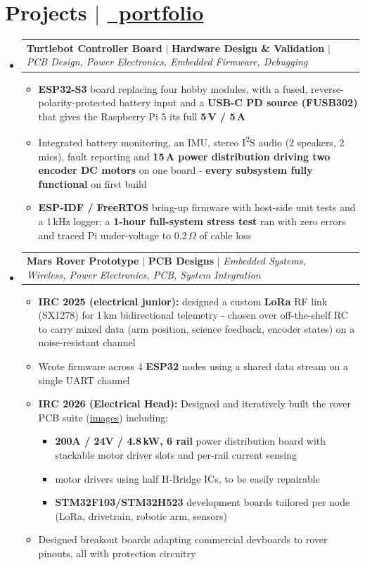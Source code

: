 \documentclass[a4paper,11pt]{article}
\makeatletter
\newcommand{\resumeItem}[1]{
  \item\small{{#1 \vspace{-2pt}}}
}
\newcommand{\resumeProjectHeading}[2]{
    \item
    \begin{tabular*}{1.001\textwidth}{l@{\extracolsep{\fill}}r}
      \small#1 & \textbf{\small #2}\\
    \end{tabular*}\vspace{-5pt}
}
\newcommand{\resumeSubHeadingListStart}{\begin{itemize}[leftmargin=0.0in, label={}]}
\newcommand{\resumeSubHeadingListEnd}{\end{itemize}}
\newcommand{\resumeItemListStart}{\begin{itemize}}
\newcommand{\resumeItemListEnd}{\end{itemize}\vspace{-5pt}}
\makeatother
\begin{document}
\section{Projects $|$ \href{https://github.com/anbu-05/Portfolio}{\normalfont\footnotesize
\faGithub\ portfolio}}
\vspace{-5pt}
\resumeSubHeadingListStart
\resumeProjectHeading
    {\textbf{Turtlebot Controller Board} $|$ \textbf{Hardware Design \& Validation} $|$ \emph{PCB Design, Power Electronics, Embedded Firmware, Debugging}}{}
    \resumeItemListStart
        \resumeItem{\textbf{ESP32-S3} board replacing four hobby modules, with a fused, reverse-polarity-protected battery input and a \textbf{USB-C PD source (FUSB302)} that gives the Raspberry Pi 5 its full \textbf{5\,V / 5\,A}}
        \resumeItem{Integrated battery monitoring, an IMU, stereo I\textsuperscript{2}S audio (2 speakers, 2 mics), fault reporting and \textbf{15\,A power distribution driving two encoder DC motors} on one board - \textbf{every subsystem fully functional} on first build}
        \resumeItem{\textbf{ESP-IDF / FreeRTOS} bring-up firmware with host-side unit tests and a 1\,kHz logger; a \textbf{1-hour full-system stress test} ran with zero errors and traced Pi under-voltage to 0.2\,$\Omega$ of cable loss}
    \resumeItemListEnd
\vspace{-13pt}
\resumeProjectHeading
    {\textbf{Mars Rover Prototype} $|$ \textbf{PCB Designs} $|$ \emph{Embedded Systems, Wireless, Power Electronics, PCB, System Integration}}{}
    \resumeItemListStart
        \resumeItem{\textbf{IRC 2025 (electrical junior):} designed a custom \textbf{LoRa} RF link (SX1278) for 1\,km bidirectional telemetry - chosen over off-the-shelf RC to carry mixed data (arm position, science feedback, encoder states) on a noise-resistant channel}
        \resumeItem{Wrote firmware across 4 \textbf{ESP32} nodes using a shared data stream on a single UART channel}
        \resumeItem{\textbf{IRC 2026 (Electrical Head):} Designed and iteratively built the rover PCB suite (\href{https://github.com/anbu-05/Portfolio/blob/main/pcb-design/README.md}{\underline{images}}) including:
            \begin{itemize}
                \item \textbf{200A / 24V / 4.8\,kW, 6 rail} power distribution board with stackable motor driver slots and per-rail current sensing
                \item motor drivers using half H-Bridge ICs, to be easily repairable
                \item \textbf{STM32F103/STM32H523} development boards tailored per node (LoRa, drivetrain, robotic arm, sensors)
            \end{itemize}}
        \resumeItem{Designed breakout boards adapting commercial devboards to rover pinouts, all with protection circuitry}
    \resumeItemListEnd
\resumeSubHeadingListEnd
\end{document}
